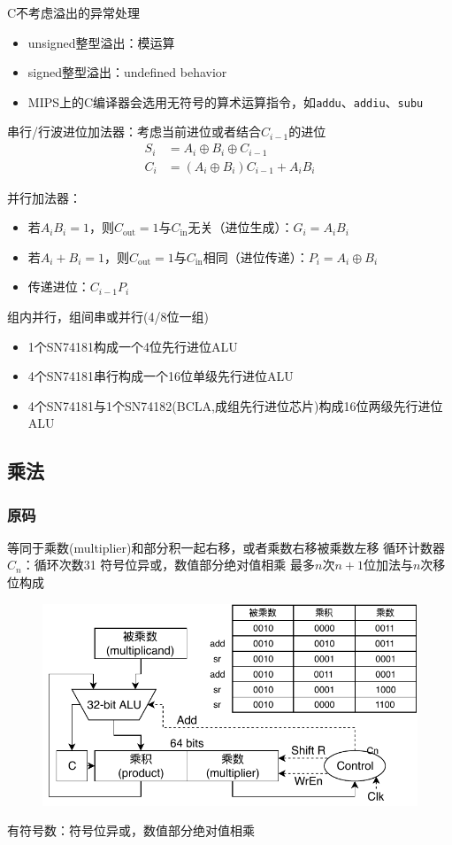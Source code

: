 C不考虑溢出的异常处理
\begin{itemize}
	\item unsigned整型溢出：模运算
	\item signed整型溢出：undefined behavior
	\item MIPS上的C编译器会选用无符号的算术运算指令，如\verb'addu'、\verb'addiu'、\verb'subu'
\end{itemize}

串行/行波进位加法器：考虑当前进位或者结合$C_{i-1}$的进位
\[\begin{aligned}
S_i&=A_i\oplus B_i\oplus C_{i-1}\\
C_i&=(A_i\oplus B_i)C_{i-1}+A_iB_i
\end{aligned}\]

并行加法器：
\begin{itemize}
	\item 若$A_iB_i=1$，则$C_{\text{out}}=1$与$C_{\text{in}}$无关（进位生成）：$G_i=A_iB_i$
	\item 若$A_i+B_i=1$，则$C_{\text{out}}=1$与$C_{\text{in}}$相同（进位传递）：$P_i=A_i\oplus B_i$
	\item 传递进位：$C_{i-1}P_i$
\end{itemize}

组内并行，组间串或并行(4/8位一组)
\begin{itemize}
	\item 1个SN74181构成一个4位先行进位ALU
	\item 4个SN74181串行构成一个16位单级先行进位ALU
	\item 4个SN74181与1个SN74182(BCLA,成组先行进位芯片)构成16位两级先行进位ALU
\end{itemize}

\subsection{乘法}
\subsubsection{原码}
等同于乘数(multiplier)和部分积一起右移，或者乘数右移被乘数左移
循环计数器$C_n$：循环次数31
符号位异或，数值部分绝对值相乘
最多$n$次$n+1$位加法与$n$次移位构成
\begin{figure}[H]
\centering
\includegraphics[width=0.6\linewidth]{fig/Arithmetic-Mulplication.pdf}
\end{figure}
有符号数：符号位异或，数值部分绝对值相乘


